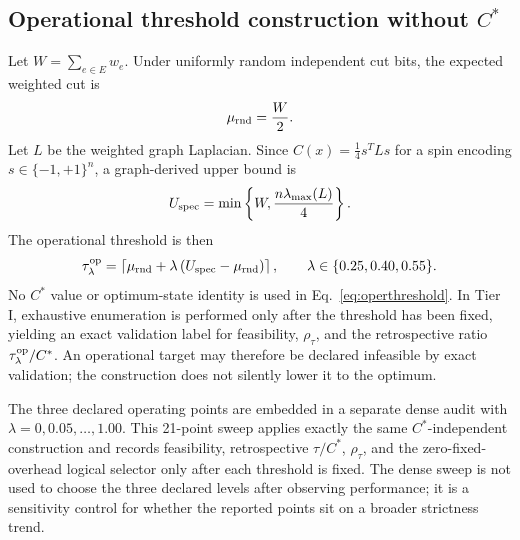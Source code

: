 \documentclass[5p,times]{elsarticle}
\providecommand{\texorpdfstring}[2]{#1}
\begin{document}
\subsection{Operational threshold construction without \texorpdfstring{$C^*$}{C*}}
Let $W=\sum_{e\in E}w_e$. Under uniformly random independent cut bits, the expected weighted cut is
\begin{equation}
\mu_{\rm rnd}=\frac{W}{2}.
\end{equation}
Let $L$ be the weighted graph Laplacian. Since $C(x)=\tfrac14 s^T Ls$ for a spin encoding $s\in\{-1,+1\}^n$, a graph-derived upper bound is
\begin{equation}
U_{\rm spec}=\min\left\{W,\frac{n\lambda_{\max}(L)}{4}\right\}.
\end{equation}
The operational threshold is then
\begin{equation}
\tau_\lambda^{\rm op}=\left\lceil\mu_{\rm rnd}+\lambda\left(U_{\rm spec}-\mu_{\rm rnd}\right)\right\rceil,
\qquad \lambda\in\{0.25,0.40,0.55\}.
\label{eq:operthreshold}
\end{equation}
No $C^*$ value or optimum-state identity is used in Eq.~\eqref{eq:operthreshold}. In Tier I, exhaustive enumeration is performed only after the threshold has been fixed, yielding an exact validation label for feasibility, $\rho_\tau$, and the retrospective ratio $\tau_\lambda^{\rm op}/C^*$. An operational target may therefore be declared infeasible by exact validation; the construction does not silently lower it to the optimum.

The three declared operating points are embedded in a separate dense audit with $\lambda=0,0.05,\ldots,1.00$. This 21-point sweep applies exactly the same $C^*$-independent construction and records feasibility, retrospective $\tau/C^*$, $\rho_\tau$, and the zero-fixed-overhead logical selector only after each threshold is fixed. The dense sweep is not used to choose the three declared levels after observing performance; it is a sensitivity control for whether the reported points sit on a broader strictness trend.

\begin{table}[t]
\centering
\caption{Operational thresholds constructed without $C^*$. Feasibility, $\tau/C^*$, and $\rho_\tau$ are retrospective exact-tier validation quantities and are not inputs to threshold construction.}
\label{tab:operthreshold}

\end{table}
\end{document}
